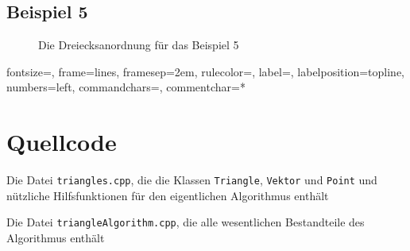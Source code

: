\documentclass[a4paper, notitlepage, 12pt]{scrartcl}
\newenvironment{longlisting}{\captionsetup{type=listing}}{}
\begin{document}
\subsection{Beispiel 5}
\begin{figure}[H] 
	
	\caption{Die Dreiecksanordnung für das Beispiel 5}
\end{figure}
%
{fontsize=\footnotesize,
	frame=lines,  %
	framesep=2em, %
	rulecolor=\color{Gray},
	label=,
	labelposition=topline,
	numbers=left,
	commandchars=\|\(\), %
	commentchar=*        %
}
 \section{Quellcode}
 \renewcommand{\listingscaption}{Quellcode}
 
 \begin{longlisting}
 	
 	\caption{Die Datei \texttt{triangles.cpp}, die die Klassen \texttt{Triangle}, \texttt{Vektor} und \texttt{Point} und nützliche Hilfsfunktionen für den eigentlichen Algorithmus enthält}
 	
 	\caption{Die Datei \texttt{triangleAlgorithm.cpp}, die alle wesentlichen Bestandteile des Algorithmus enthält}
 \end{longlisting}
 
 
\end{document}
